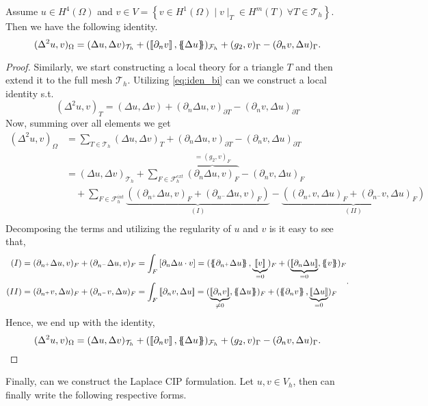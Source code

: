 \begin{lemma}
 Assume $u \in H^{4}( \Omega ) $ and $v \in  V = \left\{ v \in H^{1}( \Omega )  \mid  v \mid _{T} \in H^{m}( T) \ \forall T \in \mathcal{T} _{h}   \right\} $. Then we have the following identity.
\[
( \Delta ^2 u, v ) _{\Omega } = ( \Delta u, \Delta v)_{\mathcal{T} _{h} }  +  ( \left[\!\left[  \partial _{n} v \right]\!\right] , \left\{\!\!\left\{ \Delta u \right\}\!\!\right\})_{\mathcal{F}_{h} }  + ( g_{2} , v )_{\Gamma } - ( \partial _{n} v, \Delta u)_{\Gamma }.
\]

\end{lemma}
\begin{proof}
  Similarly, we start constructing a local theory for a triangle $T$ and then extend it to the full mesh $\mathcal{T}_{h} $.
Utilizing \eqref{eq:iden_bi} can we construct a local identity s.t. \[
( \Delta ^2 u, v ) _{T} = ( \Delta u, \Delta v) +  ( \partial _{n} \Delta u, v)_{\partial T} - ( \partial _{n} v, \Delta u) _{\partial T}
\]
Now, summing over all elements we get \[
    \begin{split}
( \Delta ^2 u, v ) _{\Omega } & = \sum_{T \in \mathcal{T}_{h} }^{}  ( \Delta u, \Delta v)_{T}
+  ( \partial _{n} \Delta u, v)_{\partial T} - ( \partial _{n} v, \Delta u) _{\partial T} \\
 & =   ( \Delta u, \Delta v)_{\mathcal{T} _{h}} +  \sum_{F \in \mathcal{F}_{h}^{ext} }^{}
  \overbrace{( \partial _{n} \Delta u, v)_{ F}}^{=( g_{2},v)_{F} }  - ( \partial _{n} v, \Delta u) _{F} \\
  &   \quad + \sum_{F \in \mathcal{F}_{h}^{int} }^{} \underbrace{( ( \partial _{n^{+}} \Delta u, v)_{ F} + ( \partial _{n^{-}} \Delta u, v)_{ F} )}_{(I)}  - \underbrace{( ( \partial _{n^{+}} v, \Delta u) _{F} + ( \partial _{n^{-}} v, \Delta u) _{F}
  )}_{(II)}   \\
    \end{split}
\]
Decomposing the terms and utilizing the regularity of $u$ and $v$ is it easy to see that,    \[
\begin{split}
    (I) & = ( \partial _{n^{+}} \Delta u, v)_{ F} + ( \partial _{n^{-}} \Delta u, v)_{ F}  = \int_{F}^{} \left[ \partial _{n} \Delta u \cdot  v \right] =  (  \mean{ \partial _{n^{+}} \Delta u } , \underbrace{\jump{v  }}_{ = 0}      )_{ F} + (  \underbrace{\jump{ \partial _{n}
    \Delta u }}_{=0}  , \mean{v  }     )_{ F} \\
    (II) &=  ( \partial _{n^{+}} v, \Delta u) _{F} + ( \partial _{n^{-}} v, \Delta u) _{F} = \int_{F}^{} \jump{ \partial _{n} v, \Delta u } =  ( \underbrace{\jump{ \partial _{n} v}}_{ \neq 0 } , \mean{ \Delta u })_{F}  + ( \mean{ \partial _{n} v}, \underbrace{\jump{ \Delta u
    }}_{=0} )_{F}
\end{split} .
\]
Hence, we end up with the identity,
\[
( \Delta ^2 u, v ) _{\Omega } = ( \Delta u, \Delta v)_{\mathcal{T} _{h} }  +  ( \left[\!\left[  \partial _{n} v \right]\!\right] , \left\{\!\!\left\{ \Delta u \right\}\!\!\right\})_{\mathcal{F}_{h} }  + ( g_{2} , v )_{\Gamma } - ( \partial _{n} v, \Delta u)_{\Gamma }.
\]


\end{proof}
Finally, can we construct the Laplace CIP formulation. Let $u,v \in V_{h}$, then can finally write the following respective forms.


